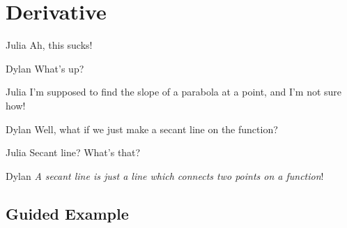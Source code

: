 \documentclass{ximera}
\begin{document}
\section{Derivative}
\begin{dialogue}
\item[Julia] Ah, this sucks!
\item[Dylan] What's up?
\item[Julia] I'm supposed to find the slope of a parabola at a point, and I'm not sure how!
\item[Dylan] Well, what if we just make a secant line on the function?
\item[Julia] Secant line? What's that?
\item[Dylan] \textit{A secant line is just a line which connects two points on a function}!
\end{dialogue}

\subsection{Guided Example}
\end{document}
